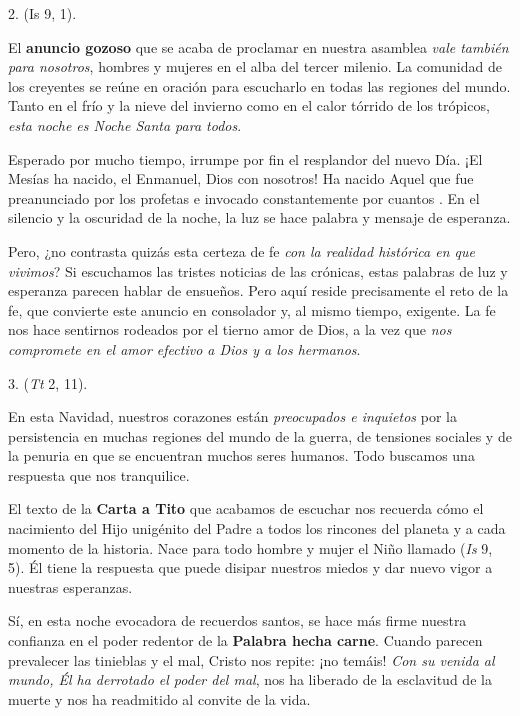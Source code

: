 \begin{body}
\begin{body}
2.  (Is 9, 1).

El \textbf{anuncio gozoso} que se acaba de proclamar en nuestra asamblea \emph{vale también para nosotros}, hombres y mujeres en el alba del tercer milenio. La comunidad de los creyentes se reúne en oración para escucharlo en todas las regiones del mundo. Tanto en el frío y la nieve del invierno como en el calor tórrido de los trópicos, \emph{esta noche es Noche Santa para todos}.

Esperado por mucho tiempo, irrumpe por fin el resplandor del nuevo Día. ¡El Mesías ha nacido, el Enmanuel, Dios con nosotros! Ha nacido Aquel que fue preanunciado por los profetas e invocado constantemente por cuantos . En el silencio y la oscuridad de la noche, la luz se hace palabra y mensaje de esperanza.

Pero, ¿no contrasta quizás esta certeza de fe \emph{con la realidad histórica en que vivimos}? Si escuchamos las tristes noticias de las crónicas, estas palabras de luz y esperanza parecen hablar de ensueños. Pero aquí reside precisamente el reto de la fe, que convierte este anuncio en consolador y, al mismo tiempo, exigente. La fe nos hace sentirnos rodeados por el tierno amor de Dios, a la vez que \emph{nos compromete en el amor efectivo a Dios y a los hermanos}.

3. \emph{} (\emph{Tt} 2, 11).

En esta Navidad, nuestros corazones están \emph{preocupados e inquietos} por la persistencia en muchas regiones del mundo de la guerra, de tensiones sociales y de la penuria en que se encuentran muchos seres humanos. Todo buscamos una respuesta que nos tranquilice.

El texto de la \textbf{Carta a Tito} que acabamos de escuchar nos recuerda cómo el nacimiento del Hijo unigénito del Padre \emph{} a todos los rincones del planeta y a cada momento de la historia. Nace para todo hombre y mujer el Niño llamado \emph{} (\emph{Is} 9, 5). Él tiene la respuesta que puede disipar nuestros miedos y dar nuevo vigor a nuestras esperanzas.

Sí, en esta noche evocadora de recuerdos santos, se hace más firme nuestra confianza en el poder redentor de la \textbf{Palabra hecha carne}. Cuando parecen prevalecer las tinieblas y el mal, Cristo nos repite: ¡no temáis! \emph{Con su venida al mundo, Él ha derrotado el poder del mal}, nos ha liberado de la esclavitud de la muerte y nos ha readmitido al convite de la vida.


\end{body}
\end{body}
